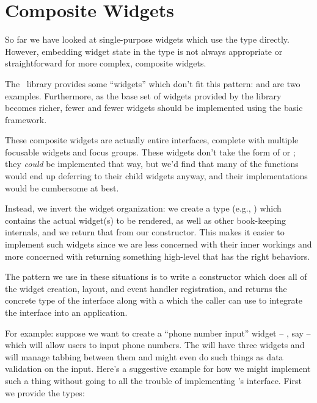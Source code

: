 \section{Composite Widgets}

So far we have looked at single-purpose widgets which use the
 type directly.  However, embedding widget state in the
 type is not always appropriate or straightforward for more
complex, composite widgets.

The \vtyui\ library provides some ``widgets'' which don't fit this
pattern:  and  are two examples.
Furthermore, as the base set of widgets provided by the library
becomes richer, fewer and fewer widgets should be implemented using
the basic  framework.

These composite widgets are actually entire interfaces, complete with
multiple focusable widgets and focus groups.  These widgets don't take
the form of  or ; they
\textit{could} be implemented that way, but we'd find that many of the
 functions would end up deferring to their child
widgets anyway, and their  implementations would be
cumbersome at best.

Instead, we invert the widget organization: we create a type (e.g.,
) which contains the actual widget(s) to be rendered, as
well as other book-keeping internals, and we return that from our
constructor.  This makes it easier to implement such widgets since we
are less concerned with their inner workings and more concerned with
returning something high-level that has the right behaviors.

The pattern we use in these situations is to write a constructor which
does all of the widget creation, layout, and event handler
registration, and returns the concrete type of the interface along
with a  which the caller can use to integrate the
interface into an application.

For example: suppose we want to create a ``phone number input'' widget
-- , say -- which will allow users to input phone
numbers.  The  will have three  widgets and
will manage tabbing between them and might even do such things as data
validation on the input.  Here's a suggestive example for how we might
implement such a thing without going to all the trouble of
implementing 's interface.  First we provide the types:

